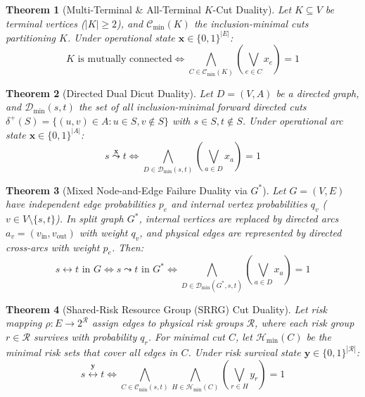 \documentclass[10pt,journal,compsoc]{IEEEtran}
\newtheorem{theorem}{Theorem}
\begin{document}
\begin{theorem}[Multi-Terminal \& All-Terminal $K$-Cut Duality]
Let $K \subseteq V$ be terminal vertices ($|K| \ge 2$), and $\mathcal{C}_{\text{min}}(K)$ the inclusion-minimal cuts partitioning $K$. Under operational state $\mathbf{x} \in \{0, 1\}^{|E|}$:
\begin{equation}
K \text{ is mutually connected} \iff \bigwedge_{C \in \mathcal{C}_{\text{min}}(K)} \left( \bigvee_{e \in C} x_e \right) = 1
\end{equation}
\end{theorem}

\begin{theorem}[Directed Dual Dicut Duality]
Let $D = (V, A)$ be a directed graph, and $\mathcal{D}_{\text{min}}(s, t)$ the set of all inclusion-minimal forward directed cuts $\delta^+(S) = \{(u, v) \in A : u \in S, v \notin S\}$ with $s \in S, t \notin S$. Under operational arc state $\mathbf{x} \in \{0, 1\}^{|A|}$:
\begin{equation}
s \stackrel{\mathbf{x}}{\leadsto} t \iff \bigwedge_{D \in \mathcal{D}_{\text{min}}(s, t)} \left( \bigvee_{a \in D} x_a \right) = 1
\end{equation}
\end{theorem}

\begin{theorem}[Mixed Node-and-Edge Failure Duality via $G^*$]
Let $G = (V, E)$ have independent edge probabilities $p_e$ and internal vertex probabilities $q_v$ ($v \in V \setminus \{s, t\}$). In split graph $G^*$, internal vertices are replaced by directed arcs $a_v = (v_{\text{in}}, v_{\text{out}})$ with weight $q_v$, and physical edges are represented by directed cross-arcs with weight $p_e$. Then:
\begin{equation}
s \longleftrightarrow t \text{ in } G \iff s \leadsto t \text{ in } G^* \iff \bigwedge_{D \in \mathcal{D}_{\text{min}}(G^*, s, t)} \left( \bigvee_{a \in D} x_a \right) = 1
\end{equation}
\end{theorem}

\begin{theorem}[Shared-Risk Resource Group (SRRG) Cut Duality]
Let risk mapping $\rho: E \to 2^{\mathcal{R}}$ assign edges to physical risk groups $\mathcal{R}$, where each risk group $r \in \mathcal{R}$ survives with probability $q_r$. For minimal cut $C$, let $\mathcal{H}_{\text{min}}(C)$ be the minimal risk sets that cover all edges in $C$. Under risk survival state $\mathbf{y} \in \{0, 1\}^{|\mathcal{R}|}$:
\begin{equation}
s \stackrel{\mathbf{y}}{\longleftrightarrow} t \iff \bigwedge_{C \in \mathcal{C}_{\text{min}}(s, t)} \bigwedge_{H \in \mathcal{H}_{\text{min}}(C)} \left( \bigvee_{r \in H} y_r \right) = 1
\end{equation}
\end{theorem}
\end{document}
